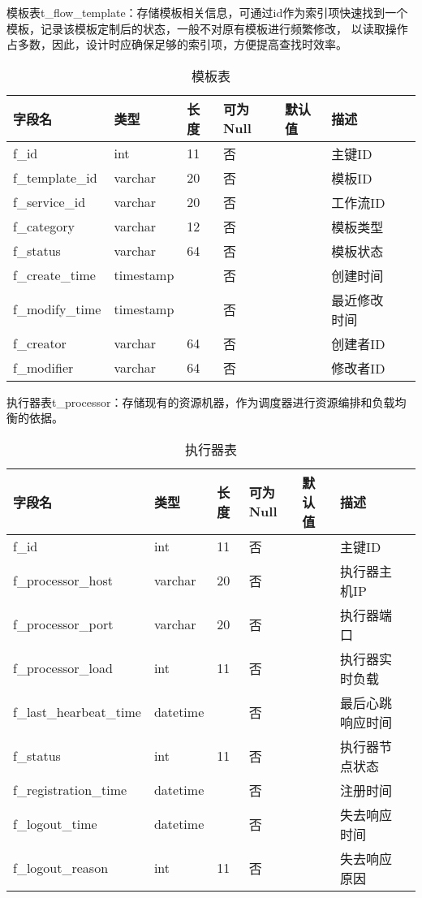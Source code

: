 模板表t\_flow\_template：存储模板相关信息，可通过id作为索引项快速找到一个模板，记录该模板定制后的状态，一般不对原有模板进行频繁修改，
以读取操作占多数，因此，设计时应确保足够的索引项，方便提高查找时效率。
\begin{table}[H]
    \centering
    \caption{模板表}
    \label{tab:t_flow_template}
    \begin{tabular}{lllllll}
        \toprule
        字段名	&类型	&长度	&可为Null&默认值	&描述 \\
        \midrule
        f\_id	&int	&11 &否&&主键ID \\
        f\_template\_id	&varchar	&20 &否&&模板ID \\
        f\_service\_id	&varchar	&20 &否&&工作流ID \\
        f\_category	&varchar	&12 &否&&模板类型 \\
        f\_status	&varchar	&64 &否&&模板状态 \\
        f\_create\_time	&timestamp & &否&&创建时间 \\
        f\_modify\_time   &timestamp & &否&&最近修改时间 \\
        f\_creator	&varchar	&64 &否&&创建者ID \\
        f\_modifier	&varchar	&64 &否&&修改者ID \\
        \bottomrule
    \end{tabular}
\end{table}

执行器表t\_processor：存储现有的资源机器，作为调度器进行资源编排和负载均衡的依据。
\begin{table}[H]
    \centering
    \caption{执行器表}
    \label{tab:t_processor}
    \begin{tabular}{lllllll}
        \toprule
        字段名	&类型	&长度	&可为Null &默认值	&描述 \\
        \midrule
        f\_id	&int	&11 &否&& 主键ID\\
        f\_processor\_host	&varchar	&20 &否&& 执行器主机IP\\
        f\_processor\_port	&varchar	&20 &否&& 执行器端口\\
        f\_processor\_load	&int	&11 &否&& 执行器实时负载\\
        f\_last\_hearbeat\_time	&datetime &&否&& 最后心跳响应时间\\
        f\_status	&int	&11 &否&& 执行器节点状态\\
        f\_registration\_time	&datetime &&否&& 注册时间\\
        f\_logout\_time	&datetime &&否&& 失去响应时间\\
        f\_logout\_reason	&int	&11 &否&& 失去响应原因\\
        \bottomrule
    \end{tabular}
\end{table}

